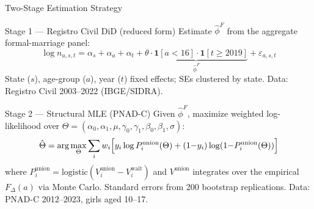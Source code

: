 \begin{frame}{Two-Stage Estimation Strategy}
    \begin{block}{Stage 1 --- Registro Civil DiD (reduced form)}
        Estimate $\hat\phi^F$ from the aggregate formal-marriage panel:
        \[
            \log n_{a,s,t} = \alpha_s + \alpha_a + \alpha_t
            + \underbrace{\theta \cdot \mathbf{1}[a{<}16] \cdot \mathbf{1}[t{\ge}2019]}_{\hat\phi^F}
            + \varepsilon_{a,s,t}
        \]
        State ($s$), age-group ($a$), year ($t$) fixed effects; SEs clustered by state.
        Data: Registro Civil 2003--2022 (IBGE/SIDRA).
    \end{block}

    \vspace{0.2cm}
    \begin{block}{Stage 2 --- Structural MLE (PNAD-C)}
        Given $\hat\phi^F$, maximize weighted log-likelihood over
        $\Theta = (\alpha_0, \alpha_1, \mu, \gamma_0, \gamma_1, \beta_0, \beta_1, \sigma)$:
        \[
            \hat\Theta = \arg\max_\Theta
            \sum_i w_i \Bigl[y_i \log P^{\text{union}}_i(\Theta)
            + (1{-}y_i)\log(1{-}P^{\text{union}}_i(\Theta))\Bigr]
        \]
        where $P^{\text{union}}_i = \text{logistic}(V^{\text{union}}_i - V^{\text{wait}}_i)$
        and $V^{\text{union}}$ integrates over the empirical $F_\Delta(a)$ via Monte Carlo.
        Standard errors from 200 bootstrap replications.
        Data: PNAD-C 2012--2023, girls aged 10--17.
    \end{block}
\end{frame}

